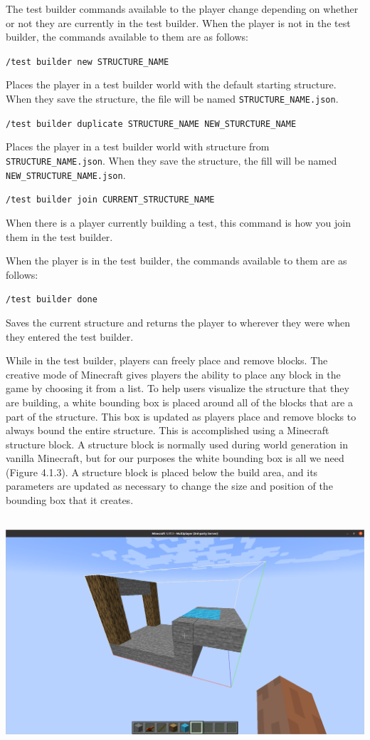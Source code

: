 \documentclass{article}
\def\code#1{\texttt{#1}}
\begin{document}
\begin{onehalfspacing}
The test builder commands available to the player change depending on
whether or not they are currently in the test builder. When the player
is not in the test builder, the commands available to them are as
follows:

\code{/test builder new STRUCTURE\_NAME}

Places the player in a test builder world with the default starting
structure. When they save the structure, the file will be named
\code{STRUCTURE\_NAME.json}.

\code{/test builder duplicate STRUCTURE\_NAME NEW\_STURCTURE\_NAME}

Places the player in a test builder world with structure from
\code{STRUCTURE\_NAME.json}. When they save the structure, the fill will be
named \code{NEW\_STRUCTURE\_NAME.json}.

\code{/test builder join CURRENT\_STRUCTURE\_NAME}

When there is a player currently building a test, this command is how
you join them in the test builder.

When the player is in the test builder, the commands available to them
are as follows:

\code{/test builder done}

Saves the current structure and returns the player to wherever they were
when they entered the test builder.

While in the test builder, players can freely place and remove blocks.
The creative mode of Minecraft gives players the ability to place any
block in the game by choosing it from a list. To help users visualize
the structure that they are building, a white bounding box is placed
around all of the blocks that are a part of the structure. This box is
updated as players place and remove blocks to always bound the entire
structure. This is accomplished using a Minecraft structure block. A
structure block is normally used during world generation in vanilla
Minecraft, but for our purposes the white bounding box is all we need
(Figure 4.1.3). A structure block is placed below the build area, and
its parameters are updated as necessary to change the size and position
of the bounding box that it creates.

\includegraphics[width=6.07813in,height=3.34897in]{media/media/image11.png}


\end{onehalfspacing}
\end{document}
